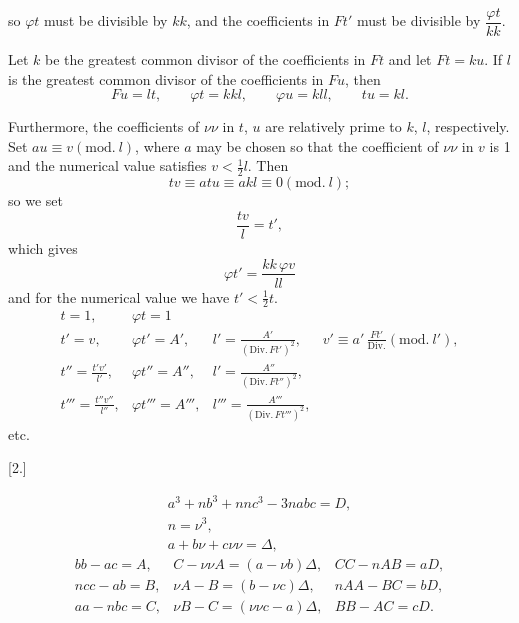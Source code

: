\noindent so $\varphi t$ must be divisible by $kk$, and the coefficients in $Ft'$ must be
divisible by $\dfrac{\varphi t}{kk}$.

Let $k$ be the greatest common divisor of the coefficients in $Ft$ and let $Ft = ku$. If
$l$ is the greatest common divisor of the coefficients in $Fu$, then
\[
Fu = lt, \qquad \varphi t = kkl, \qquad \varphi u = kll, \qquad tu = kl.
\]

Furthermore, the coefficients of $\nu\nu$ in $t$, $u$ are relatively prime to $k$, $l$, respectively.
Set $au \equiv v (\mathrm{mod.}\ l)$, where $a$ may be chosen so that the coefficient of $\nu\nu$
in $v$ is 1 and the numerical value satisfies $v < \tfrac{1}{2} l$. Then
\[
tv \equiv atu \equiv akl \equiv 0 (\mathrm{mod.}\ l);
\]
\noindent so we set
\[
\frac{tv}{l} = t',
\]
\noindent which gives
\[
\varphi t' = \frac{kk\,\varphi v}{ll}
\]
\noindent and for the numerical value we have $t' < \tfrac{1}{2} t$.
\begingroup\small
\[
\begin{array}{llll}
t=1,& \varphi t = 1 & & \\
t'=v,& \varphi t' = A', & l' = \frac{A'}{(\mathrm{Div.}\,Ft')^2}, &
v' \equiv a'\,\frac{Ft'}{\mathrm{Div.}} (\mathrm{mod.}\ l'), \\
t''=\frac{t'v'}{l'}, & \varphi t'' = A'', & l' = \frac{A''}{(\mathrm{Div.}\,Ft'')^2}, & \\
t'''=\frac{t''v''}{l''}, & \varphi t''' = A''', & l''' = \frac{A'''}{(\mathrm{Div.}\,Ft''')^2}, &
\end{array}
\]
\endgroup
etc.

\begin{center}[2.]\end{center}
\[
\begin{gathered}
a^3+nb^3+nnc^3-3nabc = D, \\
n = \nu^3, \\
a+b\nu+c\nu\nu = \Delta,
\end{gathered}
\]
\[
\begin{array}{lll}
bb-ac = A, & C-\nu\nu A = (a-\nu b)\Delta, & CC-nAB = aD, \\
ncc-ab = B, & \nu A - B = (b-\nu c)\Delta, & nAA-BC = bD, \\
aa-nbc = C, & \nu B - C = (\nu\nu c - a)\Delta, & BB-AC = cD.
\end{array}
\]

